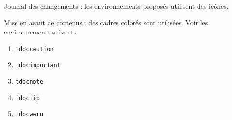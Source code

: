 \begin{tdocnew}
    \item Journal des changements : les environnements proposés utilisent des icônes.
    

    \item Mise en avant de contenus : des cadres colorés sont utilisées. Voir les environnements suivants.
    \bgroup
    \setlength{\multicolsep}{3.0pt plus 1.0pt minus 0.75pt}
    \begin{multicols}{3}
        \begin{enumerate}
        	\item \verb#tdoccaution#
        	\item \verb#tdocimportant#
        	\item \verb#tdocnote#
        	\item \verb#tdoctip#
        	\item \verb#tdocwarn#
        \end{enumerate}
    \end{multicols}
    \egroup
\end{tdocnew}
